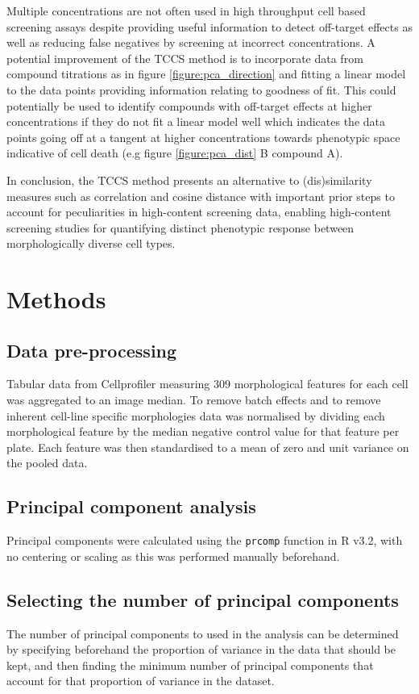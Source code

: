 \documentclass[a4paper,11pt,twoside,openright]{scrbook}
\begin{document}
Multiple concentrations are not often used in high throughput cell based screening assays despite providing useful 
information to detect off-target effects as well as reducing false negatives by screening at incorrect concentrations.
A potential improvement of the TCCS method is to incorporate data from compound titrations as in figure 
\ref{figure:pca_direction} and fitting a linear model to the data points providing information relating to goodness of 
fit.
This could potentially be used to identify compounds with off-target effects at higher concentrations if they do not 
fit a linear model well which indicates the data points going off at a tangent at higher concentrations towards 
phenotypic space indicative of cell death (e.g figure \ref{figure:pca_dist} B compound A).

In conclusion, the TCCS method presents an alternative to (dis)similarity measures such as correlation and cosine 
distance with important prior steps to account for peculiarities in high-content screening data, enabling high-content 
screening studies for quantifying distinct phenotypic response between morphologically diverse cell types.


\section{Methods}

\subsection{Data pre-processing}
Tabular data from Cellprofiler measuring 309 morphological features for each cell was aggregated to an image median.
To remove batch effects and to remove inherent cell-line specific morphologies data was normalised by dividing each 
morphological feature by the median negative control value for that feature per plate.
Each feature was then standardised to a mean of zero and unit variance on the pooled data.

\subsection{Principal component analysis}

Principal components were calculated using the \texttt{prcomp} function in R v3.2, with no centering or scaling as this 
was performed manually beforehand.

\subsection{Selecting the number of principal components}
The number of principal components to used in the analysis can be determined by specifying beforehand the proportion of 
variance in the data that should be kept, and then finding the minimum number of principal components that account for 
that proportion of variance in the dataset.
\end{document}
